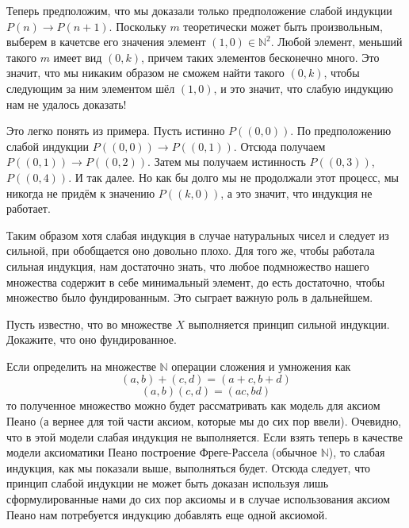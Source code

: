 Теперь предположим, что мы доказали только предположение слабой индукции $P(n)\to P(n+1)$. Поскольку $m$ теоретически может быть произвольным, выберем в качетсве его значения элемент $(1, 0) \in \mathbb{N}^2$. Любой элемент, меньший такого $m$ имеет вид $(0, k)$, причем таких элементов бесконечно много. Это значит, что мы никаким образом не сможем найти такого $(0, k)$, чтобы следующим за ним элементом шёл $(1, 0)$, и это значит, что слабую индукцию нам не удалось доказать!

Это легко понять из примера. Пусть истинно $P((0, 0))$. По предположению слабой индукции $P((0,0))\to P((0, 1))$. Отсюда получаем $P((0, 1))\to P((0, 2))$. Затем мы получаем истинность $P((0, 3))$, $P((0, 4))$. И так далее. Но как бы долго мы не продолжали этот процесс, мы никогда не придём к значению $P((k, 0))$, а это значит, что индукция не работает.

Таким образом хотя слабая индукция в случае натуральных чисел и следует из сильной, при обобщается оно довольно плохо. Для того же, чтобы работала сильная индукция, нам достаточно знать, что любое подмножество нашего множества содержит в себе минимальный элемент, до есть достаточно, чтобы множество было фундированным. Это сыграет важную роль в дальнейшем.

\begin{exercise}
Пусть известно, что во множестве $X$ выполняется принцип сильной индукции. Докажите, что оно фундированное.
\end{exercise}

Если определить на множестве $\mathbb{N}$ операции сложения и умножения как
$$(a, b) + (c, d) = (a + c, b + d)$$
$$(a, b) (c, d) = (ac, bd)$$
то полученное множество можно будет рассматривать как модель для аксиом Пеано (а вернее для той части аксиом, которые мы до сих пор ввели). Очевидно, что в этой модели слабая индукция не выполняется. Если взять теперь в качестве модели аксиоматики Пеано построение Фреге-Рассела (обычное $\mathbb{N}$), то слабая индукция, как мы показали выше, выполняться будет. Отсюда следует, что принцип слабой индукции не может быть доказан используя лишь сформулированные нами до сих пор аксиомы и в случае использования аксиом Пеано нам потребуется индукцию добавлять еще одной аксиомой.